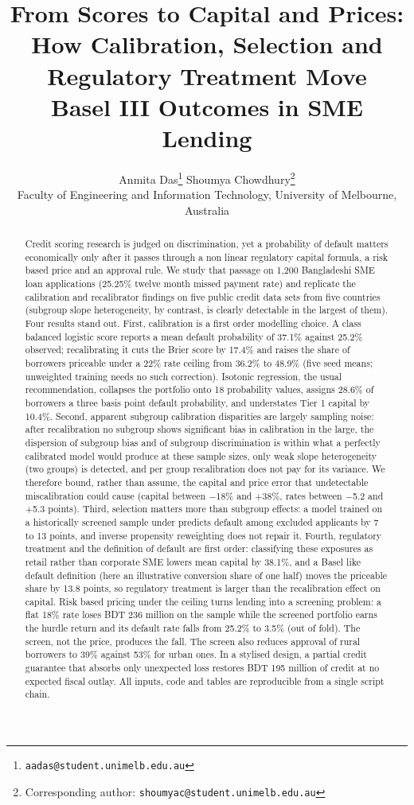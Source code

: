 \documentclass[11pt,a4paper]{article}
\title{\bfseries From Scores to Capital and Prices:\\
How Calibration, Selection and Regulatory Treatment Move\\
Basel III Outcomes in SME Lending}
\author{Anmita Das\thanks{\texttt{aadas@student.unimelb.edu.au}}
\quad Shoumya Chowdhury\thanks{Corresponding author: \texttt{shoumyac@student.unimelb.edu.au}}\\[2pt]
\small Faculty of Engineering and Information Technology, University of Melbourne, Australia}
\date{}
\begin{document}
\maketitle

\begin{abstract}
\noindent
Credit scoring research is judged on discrimination, yet a probability of default matters economically only after it passes through a non linear regulatory capital formula, a risk based price and an approval rule. We study that passage on 1{,}200 Bangladeshi SME loan applications (25.25\% twelve month missed payment rate) and replicate the calibration and recalibrator findings on five public credit data sets from five countries (subgroup slope heterogeneity, by contrast, is clearly detectable in the largest of them). Four results stand out. First, calibration is a first order modelling choice. A class balanced logistic score reports a mean default probability of 37.1\% against 25.2\% observed; recalibrating it cuts the Brier score by 17.4\% and raises the share of borrowers priceable under a 22\% rate ceiling from 36.2\% to 48.9\% (five seed means; unweighted training needs no such correction). Isotonic regression, the usual recommendation, collapses the portfolio onto 18 probability values, assigns 28.6\% of borrowers a three basis point default probability, and understates Tier 1 capital by 10.4\%. Second, apparent subgroup calibration disparities are largely sampling noise: after recalibration no subgroup shows significant bias in calibration in the large, the dispersion of subgroup bias and of subgroup discrimination is within what a perfectly calibrated model would produce at these sample sizes, only weak slope heterogeneity (two groups) is detected, and per group recalibration does not pay for its variance. We therefore bound, rather than assume, the capital and price error that undetectable miscalibration could cause (capital between $-$18\% and +38\%, rates between $-$5.2 and +5.3 points). Third, selection matters more than subgroup effects: a model trained on a historically screened sample under predicts default among excluded applicants by 7 to 13 points, and inverse propensity reweighting does not repair it. Fourth, regulatory treatment and the definition of default are first order: classifying these exposures as retail rather than corporate SME lowers mean capital by 38.1\%, and a Basel like default definition (here an illustrative conversion share of one half) moves the priceable share by 13.8 points, so regulatory treatment is larger than the recalibration effect on capital. Risk based pricing under the ceiling turns lending into a screening problem: a flat 18\% rate loses BDT 236 million on the sample while the screened portfolio earns the hurdle return and its default rate falls from 25.2\% to 3.5\% (out of fold). The screen, not the price, produces the fall. The screen also reduces approval of rural borrowers to 39\% against 53\% for urban ones. In a stylised design, a partial credit guarantee that absorbs only unexpected loss restores BDT 195 million of credit at no expected fiscal outlay. All inputs, code and tables are reproducible from a single script chain.
\bigskip


\end{abstract}
\end{document}
